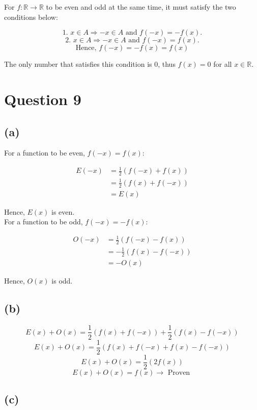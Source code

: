 \documentclass[11pt]{article}
\begin{document}
For \(f : \mathbb{R} \rightarrow \mathbb{R}\) to be even and odd at the same time, it must satisfy the two conditions below:

\[\text{1. } x \in A \Rightarrow -x \in A \text{ and } f(-x) = -f(x).\]
\[\text{2. } x \in A \Rightarrow -x \in A \text{ and } f(-x) = f(x).\]
\[\text{Hence, } f(-x) = -f(x) = f(x)\]

The only number that satisfies this condition is 0, thus \(f(x) = 0\) for all \(x \in \mathbb{R}\).


\section{Question 9}
\label{sec:org501a32f}

\subsection{(a)}
\label{sec:org6e5c584}

For a function to be even, \(f(-x) = f(x)\):

\begin{align*}
E(-x) &= \frac{1}{2}(f(-x) + f(x)) \\
&= \frac{1}{2}(f(x) + f(-x)) \\
&= E(x)
\end{align*}

Hence, \(E(x)\) is even.
\\[0pt]

For a function to be odd, \(f(-x) = -f(x)\):

\begin{align*}
O(-x) &= \frac{1}{2}(f(-x) - f(x)) \\
&= -\frac{1}{2}(f(x) - f(-x)) \\
&= -O(x)
\end{align*}

Hence, \(O(x)\) is odd.


\subsection{(b)}
\label{sec:orgd47262a}

\[E(x) + O(x) = \frac{1}{2}(f(x) + f(-x)) + \frac{1}{2}(f(x) - f(-x))\]
\[E(x) + O(x) = \frac{1}{2}(f(x) + f(-x) + f(x) - f(-x))\]
\[E(x) + O(x) = \frac{1}{2}(2f(x))\]
\[E(x) + O(x) = f(x) \rightarrow \text{ Proven }\]

\newpage


\subsection{(c)}
\label{sec:orgb445db6}
\end{document}
